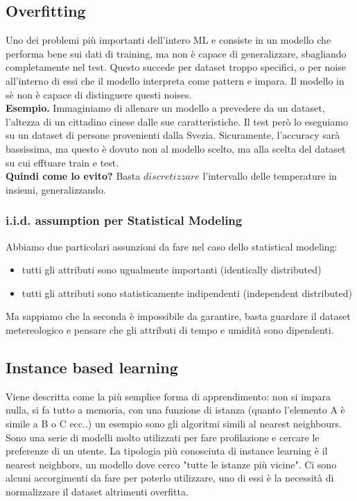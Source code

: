 \subsection{Overfitting}
Uno dei problemi più importanti dell'intero ML e consiste in un modello che performa bene sui dati di training, ma non è capace di generalizzare, sbagliando completamente nel test. Questo succede per dataset troppo specifici, o per noise all'interno di essi che il modello interpreta come pattern e impara. Il modello in sè non è capace di distinguere questi noises. 
\\
\textbf{Esempio.} Immaginiamo di allenare un modello a prevedere da un dataset, l'altezza di un cittadino cinese dalle sue caratteristiche. Il test però lo eseguiamo su un dataset di persone provenienti dalla Svezia. Sicuramente, l'accuracy sarà bassissima, ma questo è dovuto non al modello scelto, ma alla scelta del dataset su cui efftuare train e test.
\\
\textbf{Quindi come lo evito?} Basta $discretizzare$ l'intervallo delle temperature in insiemi, generalizzando.

\subsubsection{i.i.d. assumption per Statistical Modeling}
Abbiamo due particolari assunzioni da fare nel caso dello statistical modeling:
\begin{itemize}
    \item tutti gli attributi sono ugualmente importanti (identically distributed)
    \item tutti gli attributi sono statisticamente indipendenti (independent distributed)
\end{itemize}
Ma sappiamo che la seconda è impossibile da garantire, basta guardare il dataset metereologico e pensare che gli attributi di tempo e umidità sono dipendenti.

\newpage

\subsection{Instance based learning}
Viene descritta come la più semplice forma di apprendimento: non si impara nulla, si fa tutto a memoria, con una funzione di istanza (quanto l'elemento A è simile a B o C ecc..) un esempio sono gli algoritmi simili al nearest neighbours. 
\\ 
Sono una serie di modelli molto utilizzati per fare profilazione e cercare le preferenze di un utente. La tipologia più conosciuta di instance learning è il nearest neighbors, un modello dove cerco "tutte le istanze più vicine". Ci sono alcuni accorgimenti da fare per poterlo utilizzare, uno di essi è la necessità di normalizzare il dataset altrimenti overfitta. 

